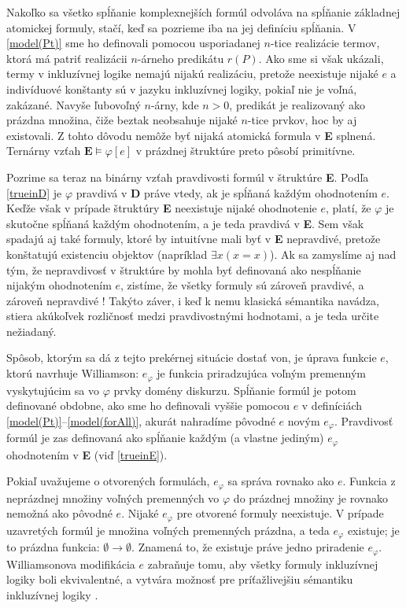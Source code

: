 \documentclass[12pt, letterpaper]{article}
\begin{document}
Nakoľko sa všetko spĺňanie komplexnejších formúl odvoláva na spĺňanie základnej atomickej formuly, stačí, keď sa pozrieme iba na jej definíciu spĺňania. V \ref{model(Pt)} sme ho definovali pomocou usporiadanej $n$-tice realizácie termov, ktorá má patriť realizácii $n$-árneho predikátu $r(P)$. Ako sme si však ukázali, termy v inkluzívnej logike nemajú nijakú realizáciu, pretože neexistuje nijaké $e$ a indivíduové konštanty sú v jazyku inkluzívnej logiky, pokiaľ nie je voľná, zakázané. Navyše ľubovoľný $n$-árny, kde $n > 0$, predikát je realizovaný ako prázdna množina, čiže beztak neobsahuje nijaké $n$-tice prvkov, hoc by aj existovali. Z tohto dôvodu nemôže byť nijaká atomická formula v \textbf{E} splnená. Ternárny vzťah $\textbf{E}\models\varphi[e]$ v prázdnej štruktúre preto pôsobí primitívne.\par

Pozrime sa teraz na binárny vzťah pravdivosti formúl v štruktúre \textbf{E}. Podľa \ref{trueinD} je $\varphi$ pravdivá v \textbf{D} práve vtedy, ak je spĺňaná každým ohodnotením $e$. Keďže však v prípade štruktúry \textbf{E} neexistuje nijaké ohodnotenie $e$, platí, že $\varphi$ je skutočne spĺňaná každým ohodnotením, a je teda pravdivá v \textbf{E}. Sem však spadajú aj také formuly, ktoré by intuitívne mali byť v \textbf{E} nepravdivé, pretože konštatujú existenciu objektov (napríklad $\exists x (x = x)$). Ak sa zamyslíme aj nad tým, že nepravdivosť v štruktúre by mohla byť definovaná ako nespĺňanie nijakým ohodnotením $e$, zistíme, že všetky formuly sú zároveň pravdivé, a zároveň nepravdivé \parencites[4]{williamson_note_1999}! Takýto záver, i keď k nemu klasická sémantika navádza, stiera akúkoľvek rozličnosť medzi pravdivostnými hodnotami, a je teda určite nežiadaný.\par
Spôsob, ktorým sa dá z tejto prekérnej situácie dostať von, je úprava funkcie $e$, ktorú navrhuje Williamson: $e_\varphi$ je funkcia priradzujúca voľným premenným vyskytujúcim sa vo $\varphi$ prvky domény diskurzu. Spĺňanie formúl je potom definované obdobne, ako sme ho definovali vyššie pomocou $e$ v definíciách \ref{model(Pt)}--\ref{model(forAll)}, akurát nahradíme pôvodné $e$ novým $e_\varphi$. Pravdivosť formúl je zas definovaná ako spĺňanie každým (a vlastne jediným) $e_\varphi$ ohodnotením v \textbf{E}  (viď \ref{trueinE}).\par 


Pokiaľ uvažujeme o otvorených formulách, $e_\varphi$ sa správa rovnako ako $e$. Funkcia z neprázdnej množiny voľných premenných vo $\varphi$ do prázdnej množiny je rovnako nemožná ako pôvodné $e$. Nijaké $e_\varphi$ pre otvorené formuly neexistuje. V prípade uzavretých formúl je množina voľných premenných prázdna, a teda $e_\varphi$ existuje; je to prázdna funkcia: $\emptyset \rightarrow \emptyset$. Znamená to, že existuje práve jedno priradenie $e_\varphi$. Williamsonova modifikácia $e$ zabraňuje tomu, aby všetky formuly inkluzívnej logiky boli ekvivalentné, a vytvára možnosť pre príťažlivejšiu sémantiku inkluzívnej logiky \parencites[4--5]{williamson_note_1999}.\par
\end{document}
